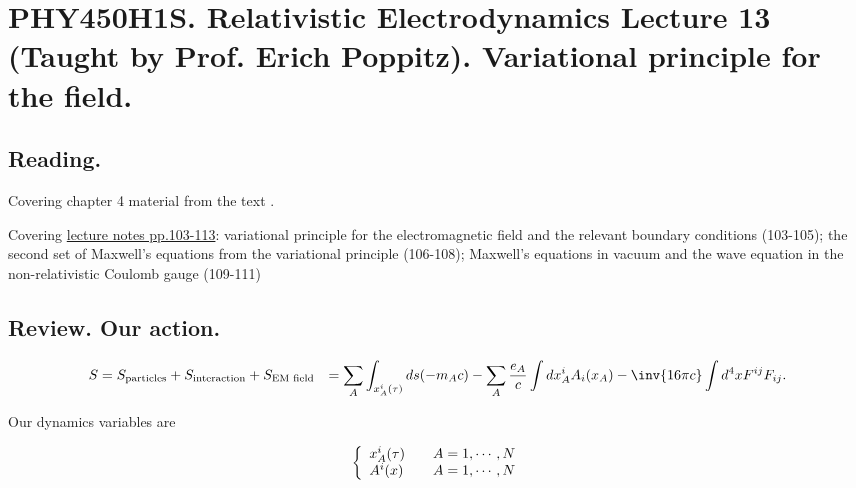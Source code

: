 
%

\chapter{PHY450H1S.  Relativistic Electrodynamics Lecture 13 (Taught by Prof. Erich Poppitz).  Variational principle for the field.}
\label{chap:relativisticElectrodynamicsL13}
{}
\date{Feb 15, 2011}

\beginArtNoToc

\section{Reading.}

Covering chapter 4 material from the text \cite{landau1980classical}.

Covering \href{http://www.physics.utoronto.ca/~poppitz/e-poppitz/PHY450_files/RelEMpp103-113.pdf}{lecture notes pp.103-113}: variational principle for the electromagnetic field and the relevant boundary conditions (103-105); the second set of Maxwell's equations from the variational principle (106-108); Maxwell's equations in vacuum and the wave equation in the non-relativistic Coulomb gauge (109-111)

\section{Review.  Our action.}

\begin{align*}\label{eqn:relativisticElectrodynamicsL13:10}
S
&= S_{\text{particles}} + S_{\text{interaction}} + S_{\text{EM field}}
&= \sum_A \int_{x_A^i(\tau)} ds ( -m_A c )
- \sum_A
\frac{e_A}{c}
\int dx_A^i A_i(x_A)
- \inv{16 \pi c} \int d^4 x F^{ij } F_{ij}.
\end{align*}

Our dynamics variables are

\begin{equation}\label{eqn:relativisticElectrodynamicsL13:30}
\left\{
\begin{array}{l l}
x_A^i(\tau) & \quad \mbox{$A = 1, \cdots, N$} \\
A^i(x) & \quad \mbox{$A = 1, \cdots, N$}
\end{array}
\right.
\end{equation}

